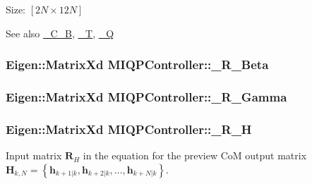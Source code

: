 \-Size\-: $[2N\times12N]$

\begin{DoxySeeAlso}{\-See also}
\hyperlink{classMIQPController_a5c6882cb248e9d16513868fea7835d6e}{\-\_\-\-C\-\_\-\-B}, \hyperlink{classMIQPController_a1143455ae85d0e221578dbe5d659af1d}{\-\_\-\-T}, \hyperlink{classMIQPController_ac6404f74d6002d6a0ca4bd2d0b41d548}{\-\_\-\-Q} 
\end{DoxySeeAlso}
\hypertarget{classMIQPController_a4a9008d6bc09776aba999f94b326ba21}{
\subsubsection[{\-\_\-\-R\-\_\-\-Beta}]{\setlength{\rightskip}{0pt plus 5cm}\-Eigen\-::\-Matrix\-Xd {\bf \-M\-I\-Q\-P\-Controller\-::\-\_\-\-R\-\_\-\-Beta}}}\label{classMIQPController_a4a9008d6bc09776aba999f94b326ba21}
\hypertarget{classMIQPController_aba668abb8294cd636d67ae66e8c00daf}{
\subsubsection[{\-\_\-\-R\-\_\-\-Gamma}]{\setlength{\rightskip}{0pt plus 5cm}\-Eigen\-::\-Matrix\-Xd {\bf \-M\-I\-Q\-P\-Controller\-::\-\_\-\-R\-\_\-\-Gamma}}}\label{classMIQPController_aba668abb8294cd636d67ae66e8c00daf}
\hypertarget{classMIQPController_a2207c17eb221166b1bc12fbca976035d}{
\subsubsection[{\-\_\-\-R\-\_\-\-H}]{\setlength{\rightskip}{0pt plus 5cm}\-Eigen\-::\-Matrix\-Xd {\bf \-M\-I\-Q\-P\-Controller\-::\-\_\-\-R\-\_\-\-H}}}\label{classMIQPController_a2207c17eb221166b1bc12fbca976035d}
\-Input matrix $\mathbf{R}_H$ in the equation for the preview \-Co\-M output matrix $\mathbf{H}_{k,N} = \left\{ \mathbf{h}_{k+1|k}, \mathbf{h}_{k+2|k}, \dots, \mathbf{h}_{k+N|k} \right\}$.

